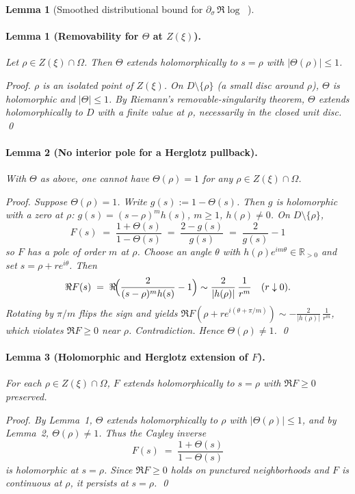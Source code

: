 \documentclass[11pt]{article}
\newtheorem{lemma}[theorem]{Lemma}
\theoremstyle{definition}
\theoremstyle{remark}
\DeclareMathOperator{\dettwo}{det_2}
\begin{document}
\begin{lemma}[Smoothed distributional bound for $\partial_\sigma\,\Re\log\dettwo$]
\paragraph{Lemma 1 (Removability for $\Theta$ at $Z(\xi)$).}
Let $\rho\in Z(\xi)\cap\Omega$. Then $\Theta$ extends holomorphically to $s=\rho$ with $|\Theta(\rho)|\le 1$.


\emph{Proof.}
$\rho$ is an isolated point of $Z(\xi)$. On $D\setminus\{\rho\}$ (a small disc around $\rho$), $\Theta$ is holomorphic and $|\Theta|\le 1$. By Riemann's removable-singularity theorem, $\Theta$ extends holomorphically to $D$ with a finite value at $\rho$, necessarily in the closed unit disc. \qed


\paragraph{Lemma 2 (No interior pole for a Herglotz pullback).}
With $\Theta$ as above, one cannot have $\Theta(\rho)=1$ for any $\rho\in Z(\xi)\cap\Omega$.


\emph{Proof.}
Suppose $\Theta(\rho)=1$. Write $g(s):=1-\Theta(s)$. Then $g$ is holomorphic with a zero at $\rho$: $g(s)=(s-\rho)^m h(s)$, $m\ge 1$, $h(\rho)\neq 0$. On $D\setminus\{\rho\}$,
\[
F(s)\;=\;\frac{1+\Theta(s)}{1-\Theta(s)}\;=\;\frac{2-g(s)}{g(s)}\;=\;\frac{2}{g(s)}-1
\]
so $F$ has a pole of order $m$ at $\rho$. Choose an angle $\theta$ with $h(\rho)e^{im\theta}\in\mathbb R_{>0}$ and set $s=\rho+re^{i\theta}$. Then
\[
\Re F(s)\;=\;\Re\!\Bigl(\frac{2}{(s-\rho)^m h(s)}-1\Bigr)
\sim \frac{2}{|h(\rho)|}\,\frac{1}{r^{m}}\quad(r\downarrow 0).
\]
Rotating by $\pi/m$ flips the sign and yields $\Re F(\rho+re^{i(\theta+\pi/m)})\sim -\frac{2}{|h(\rho)|}\,\frac{1}{r^{m}}$, which violates $\Re F\ge 0$ near $\rho$. Contradiction. Hence $\Theta(\rho)\neq 1$. \qed


\paragraph{Lemma 3 (Holomorphic and Herglotz extension of $F$).}
For each $\rho\in Z(\xi)\cap\Omega$, $F$ extends holomorphically to $s=\rho$ with $\Re F\ge 0$ preserved.


\emph{Proof.}
By Lemma~1, $\Theta$ extends holomorphically to $\rho$ with $|\Theta(\rho)|\le 1$, and by Lemma~2, $\Theta(\rho)\neq 1$. Thus the Cayley inverse
\[
F(s)\;=\;\frac{1+\Theta(s)}{1-\Theta(s)}
\]
is holomorphic at $s=\rho$. Since $\Re F\ge 0$ holds on punctured neighborhoods and $F$ is continuous at $\rho$, it persists at $s=\rho$. \qed



\end{lemma}
\end{document}

